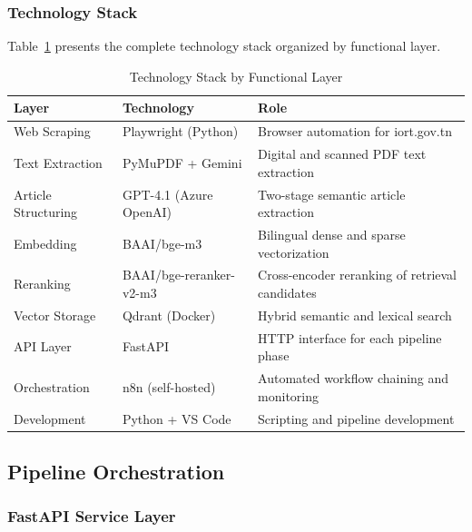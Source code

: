 \subsubsection{Technology Stack}

Table~\ref{tab:tech-stack} presents the complete technology stack organized by functional layer.

\begin{table}[H]
\centering
\caption{Technology Stack by Functional Layer}
\label{tab:tech-stack}
\renewcommand{\arraystretch}{1.3}
\begin{tabular}{|p{3.2cm}|p{3.8cm}|p{5.5cm}|}
\hline
\textbf{Layer} & \textbf{Technology} & \textbf{Role} \\
\hline
Web Scraping & Playwright (Python) \cite{playwright2024docs} & Browser automation for iort.gov.tn \\
\hline
Text Extraction & PyMuPDF \cite{pymupdf2024docs} + Gemini \cite{google2024vertexai} & Digital and scanned \ac{PDF} text extraction \\
\hline
Article Structuring & GPT-4.1 (Azure OpenAI) \cite{microsoft2024azureopenai} & Two-stage semantic article extraction \\
\hline
Embedding & BAAI/bge-m3 \cite{chen2024bgem3} & Bilingual dense and sparse vectorization \\
\hline
Reranking & BAAI/bge-reranker-v2-m3 \cite{bge_reranker2024} & Cross-encoder reranking of retrieval candidates \\
\hline
Vector Storage & Qdrant (Docker) \cite{qdrant2024docs} & Hybrid semantic and lexical search \\
\hline
\ac{API} Layer & FastAPI \cite{fastapi2024docs} & HTTP interface for each pipeline phase \\
\hline
Orchestration & n8n (self-hosted) \cite{n8n2024docs} & Automated workflow chaining and monitoring \\
\hline
Development & Python \cite{python2024docs} + VS Code \cite{microsoft2024vscode} & Scripting and pipeline development \\
\hline
\end{tabular}
\end{table}

\subsection{Pipeline Orchestration}
\label{sec:pipeline-orchestration}

\subsubsection{FastAPI Service Layer}
\label{subsec:fastapi-service}

